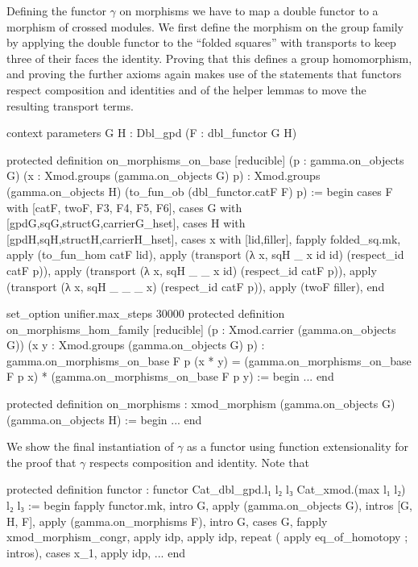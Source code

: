 Defining the functor $\gamma$ on morphisms we have to map a double functor to a
morphism of crossed modules.
We first define the morphism on the group family by applying the double functor
to the ``folded squares'' with transports to keep three of their faces the identity.
Proving that this defines a group homomorphism, and proving the further axioms
again makes use of the statements that functors respect composition and identities
and of the helper lemmas to move the resulting transport terms.
\begin{leancodebr}
  context
  parameters {G H : Dbl_gpd} (F : dbl_functor G H)

  protected definition on_morphisms_on_base [reducible]
    (p : gamma.on_objects G) (x : Xmod.groups (gamma.on_objects G) p) :
    Xmod.groups (gamma.on_objects H) (to_fun_ob (dbl_functor.catF F) p) :=
  begin
    cases F with [catF, twoF, F3, F4, F5, F6],
    cases G with [gpdG,sqG,structG,carrierG_hset],
    cases H with [gpdH,sqH,structH,carrierH_hset],
    cases x with [lid,filler],
    fapply folded_sq.mk, apply (to_fun_hom catF lid),
    apply (transport (λ x, sqH _ x id id) (respect_id catF p)),
    apply (transport (λ x, sqH _ _ x id) (respect_id catF p)),
    apply (transport (λ x, sqH _ _ _ x) (respect_id catF p)),
    apply (twoF filler),
  end

  set_option unifier.max_steps 30000
  protected definition on_morphisms_hom_family [reducible]
    (p : Xmod.carrier (gamma.on_objects G)) 
    (x y : Xmod.groups (gamma.on_objects G) p) :
    gamma.on_morphisms_on_base F p (x * y) =
    (gamma.on_morphisms_on_base F p x) * (gamma.on_morphisms_on_base F p y) :=
  begin
    ...
  end
  
  protected definition on_morphisms :
    xmod_morphism (gamma.on_objects G) (gamma.on_objects H) :=
  begin
    ...
  end
\end{leancodebr}

We show the final instantiation of $\gamma$ as a functor using function extensionality
for the proof that $\gamma$ respects composition and identity.
Note that 
\begin{leancodebr}
  protected definition functor :
    functor Cat_dbl_gpd.{l₁ l₂ l₃} Cat_xmod.{(max l₁ l₂) l₂ l₃} :=
  begin
    fapply functor.mk,
      intro G, apply (gamma.on_objects G),
      intros [G, H, F], apply (gamma.on_morphisms F),
      intro G, cases G,
        fapply xmod_morphism_congr, apply idp, apply idp,
        repeat ( apply eq_of_homotopy ; intros), cases x_1, apply idp,
    ...
  end
\end{leancodebr}

